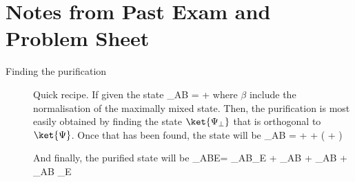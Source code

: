 \section{Notes from Past Exam and Problem Sheet}
\begin{description}
\item[Finding the purification] Quick recipe. If given the state
\beq
\rho_{AB} = \alpha \ket{\Psi}\bra{\Psi} + \beta \identity
\eeq
where $\beta$ include the normalisation of the maximally mixed state. Then, the purification is most easily obtained by finding the state $\ket{\Psi_\perp}$ that is orthogonal to $\ket{\Psi}$. Once that has been found, the state will be
\beq
\rho_{AB} =  \ket{\Psi}\bra{\Psi} + \beta \ket{\Psi_\perp} \bra{\Psi_\perp} + \beta \left(  +  \right)
\eeq

And finally, the purified state will be
\beq
\ket{\psi}_{ABE}=  \ket{\Psi} _{AB}_E + \sqrt{\beta} \ket{\Psi_\perp}_{AB}  + \beta {}_{AB}  + \sqrt{\beta} _{AB} _E
\eeq





\end{description}
